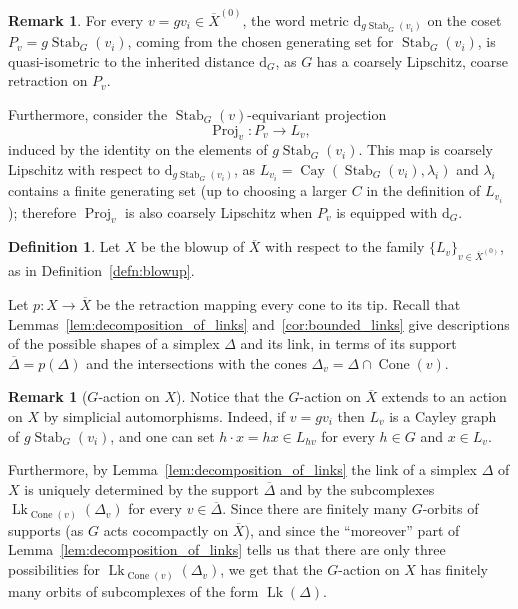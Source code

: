 \documentclass[svgnames]{amsart}
\theoremstyle{plain}
\theoremstyle{definition}
\newtheorem{defn}[thm]{Definition}
\newtheorem{rem}[thm]{Remark}
\newcommand{\Cay}[2]{\operatorname{Cay}\left(#1,#2\right)}
\newcommand{\ov}[1]{\overline{#1}}
\newcommand{\dist}{\mathrm{d}}
\newcommand{\link}{\operatorname{Lk}}
\newcommand{\Stab}[2]{\operatorname{Stab}_{#1}(#2)}
\newcommand{\Proj}{\operatorname{Proj}}
\newcommand{\Squid}{\operatorname{Cone}}
\begin{document}
\begin{rem}\label{rem:Pv_to_Lv}
For every $v=gv_i\in \ov{X}^{(0)}$, the word metric $\dist_{g\Stab{G}{v_i}}$ on the coset $P_v=g\Stab{G}{v_i}$, coming from the chosen generating set for $\Stab{G}{v_i}$, is quasi-isometric to the inherited distance $\dist_G$, as $G$ has a coarsely Lipschitz, coarse retraction on $P_v$. 

Furthermore, consider the $\Stab{G}{v}$-equivariant projection $$\Proj_v\colon P_v\to L_v,$$ induced by the identity on the elements of $g\Stab{G}{v_i}$. This map is coarsely Lipschitz with respect to $\dist_{g\Stab{G}{v_i}}$, as $L_{v_i}=\Cay{\Stab{G}{v_i}}{\lambda_i}$ and $\lambda_i$ contains a finite generating set (up to choosing a larger $C$ in the definition of $L_{v_i}$); therefore $\Proj_v$ is also coarsely Lipschitz when $P_v$ is equipped with $\dist_G$. 
\end{rem}






\begin{defn}\label{defn:blowup_for_squidification} Let $X$ be the blowup of $\ov{X}$ with respect to the family $\{L_v\}_{v\in\ov{X}^{(0)}}$, as in Definition~\ref{defn:blowup}.
\end{defn}

Let $p\colon X\to \ov X$ be the retraction mapping every cone to its tip. Recall that Lemmas~\ref{lem:decomposition_of_links} and~\ref{cor:bounded_links} give descriptions of the possible shapes of a simplex $\Delta$ and its link, in terms of its support $\ov \Delta=p(\Delta)$ and the intersections with the cones $\Delta_v=\Delta\cap\Squid(v)$.

\begin{rem}[$G$-action on $X$]\label{rem:G_action_on_X}
    Notice that the $G$-action on $\ov X$ extends to an action on $X$ by simplicial automorphisms. Indeed, if $v=gv_i$ then $L_v$ is a Cayley graph of $g\Stab{G}{v_i}$, and one can set $h\cdot x=hx\in L_{hv}$ for every $h\in G$ and $x\in L_v$. 

    Furthermore, by Lemma~\ref{lem:decomposition_of_links} the link of a simplex $\Delta$ of $X$ is uniquely determined by the support $\ov \Delta$ and by the subcomplexes $\link_{\Squid(v)}(\Delta_v)$ for every $v\in \ov \Delta$. Since there are finitely many $G$-orbits of supports (as $G$ acts cocompactly on $\ov{X}$), and since the “moreover” part of Lemma~\ref{lem:decomposition_of_links} tells us that there are only three possibilities for $\link_{\Squid(v)}(\Delta_v)$, we get that the $G$-action on $X$ has finitely many orbits of subcomplexes of the form $\link(\Delta)$.
\end{rem}
\end{document}

